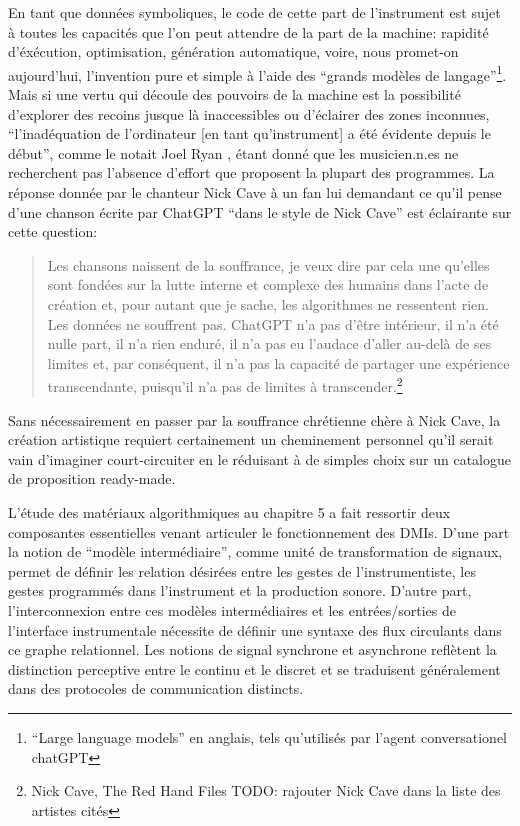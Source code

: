 En tant que données symboliques, le code de cette part de l'instrument est sujet à toutes les capacités que l'on peut attendre de la part de la machine: rapidité d'éxécution, optimisation, génération automatique, voire, nous promet-on aujourd'hui, l'invention pure et simple à l'aide des ``grands modèles de langage''\footnote{``Large language models'' en anglais, tels qu'utilisés par l'agent conversationel chatGPT}. Mais si une vertu qui découle des pouvoirs de la machine est la possibilité d'explorer des recoins jusque là inaccessibles ou d'éclairer des zones inconnues, ``l'inadéquation de l'ordinateur [en tant qu'instrument] a été évidente depuis le début'', comme le notait Joel Ryan \cite{ryan_remarks_1991}, étant donné que les musicien.n.es ne recherchent pas l'absence d'effort que proposent la plupart des programmes. La réponse donnée par le chanteur Nick Cave à un fan lui demandant ce qu'il pense d'une chanson écrite par ChatGPT ``dans le style de Nick Cave'' est éclairante sur cette question:

\begin{quotation}
Les chansons naissent de la souffrance, je veux dire par cela une qu'elles sont fondées sur la lutte interne et complexe des humains dans l'acte de création et, pour autant que je sache, les algorithmes ne ressentent rien. Les données ne souffrent pas. ChatGPT n'a pas d'être intérieur, il n'a été nulle part, il n'a rien enduré, il n'a pas eu l'audace d'aller au-delà de ses limites et, par conséquent, il n'a pas la capacité de partager une expérience transcendante, puisqu'il n'a pas de limites à transcender.\footnote{Nick Cave, The Red Hand Files TODO: rajouter Nick Cave dans la liste des artistes cités}
\end{quotation}

Sans nécessairement en passer par la souffrance chrétienne chère à Nick Cave, la création artistique requiert certainement un cheminement personnel qu'il serait vain d'imaginer court-circuiter en le réduisant à de simples choix sur un catalogue de proposition ready-made.



\noindent L'étude des matériaux algorithmiques au chapitre 5 a fait ressortir deux composantes essentielles venant articuler le fonctionnement des \glspl{DMI}. D'une part la notion de ``modèle intermédiaire'', comme unité de transformation de signaux, permet de définir les relation désirées entre les gestes de l'instrumentiste, les gestes programmés dans l'instrument et la production sonore. D'autre part, l'interconnexion entre ces modèles intermédiaires et les entrées/sorties de l'interface instrumentale nécessite de définir une syntaxe des flux circulants dans ce graphe relationnel. Les notions de signal synchrone et asynchrone reflètent la distinction perceptive entre le continu et le discret et se traduisent généralement dans des protocoles de communication distincts. 

